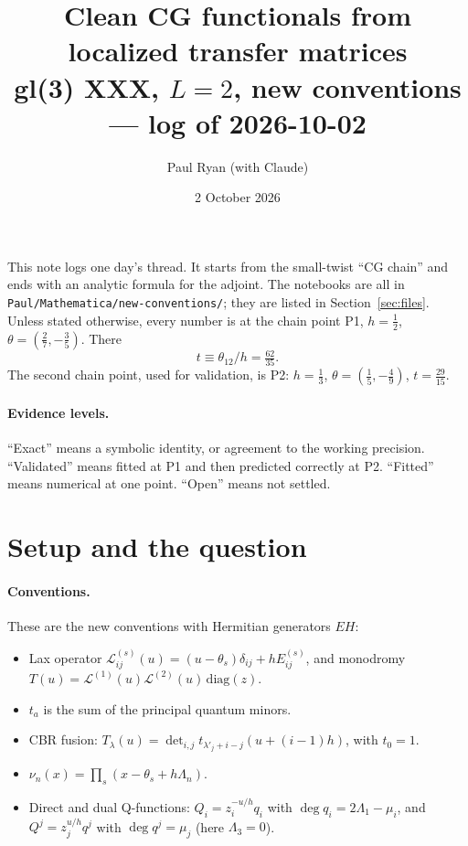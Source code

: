 \documentclass[11pt]{article}
\title{Clean CG functionals from localized transfer matrices\\[2pt]\large gl(3) XXX, $L=2$, new conventions --- log of 2026-10-02}
\author{Paul Ryan (with Claude)}
\date{2 October 2026}
\begin{document}
\maketitle

\noindent This note logs one day's thread. It starts from the small-twist ``CG chain'' and ends with an analytic formula for the adjoint. The notebooks are all in \texttt{Paul/Mathematica/new-conventions/}; they are listed in Section~\ref{sec:files}. Unless stated otherwise, every number is at the chain point P1, $h=\tfrac12$, $\theta=(\tfrac27,-\tfrac35)$. There
\[
t\equiv\theta_{12}/h=\tfrac{62}{35}.
\]
The second chain point, used for validation, is P2: $h=\tfrac13$, $\theta=(\tfrac15,-\tfrac49)$, $t=\tfrac{29}{15}$.

\paragraph{Evidence levels.} ``Exact'' means a symbolic identity, or agreement to the working precision. ``Validated'' means fitted at P1 and then predicted correctly at P2. ``Fitted'' means numerical at one point. ``Open'' means not settled.

\tableofcontents

\section{Setup and the question}

\paragraph{Conventions.} These are the new conventions with Hermitian generators $EH$:
\begin{itemize}
\item Lax operator $\mathcal L^{(s)}_{ij}(u)=(u-\theta_s)\delta_{ij}+hE^{(s)}_{ij}$, and monodromy $T(u)=\mathcal L^{(1)}(u)\mathcal L^{(2)}(u)\,\mathrm{diag}(z)$.
\item $t_a$ is the sum of the principal quantum minors.
\item CBR fusion: $T_\lambda(u)=\det_{i,j}t_{\lambda'_j+i-j}(u+(i-1)h)$, with $t_0=1$.
\item $\nu_n(x)=\prod_s(x-\theta_s+h\Lambda_n)$.
\item Direct and dual Q-functions: $Q_i=z_i^{-u/h}q_i$ with $\deg q_i=2\Lambda_1-\mu_i$, and $Q^j=z_j^{u/h}q^j$ with $\deg q^j=\mu_j$ (here $\Lambda_3=0$).
\end{itemize}
\end{document}
